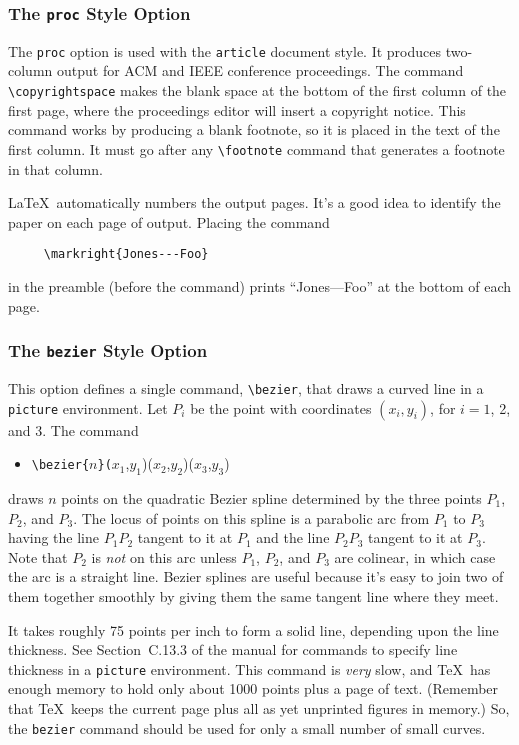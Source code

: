 \subsubsection{The {\tt proc} Style Option}

The {\tt proc} option is used with the \mbox{\tt article} document
style.  It produces two-column output for ACM and IEEE conference
proceedings.  The command \hbox{\verb|\copyrightspace|} makes the blank
space at the bottom of the first column of the first page, where the
proceedings editor will insert a copyright notice.  This command works
by producing a blank footnote, so it is placed in the text of the first
column.  It must go after any \hbox{\verb|\footnote|} command that
generates a footnote in that column.

\LaTeX\ automatically numbers the output pages.  It's a good idea
to identify the paper on each page of output.  Placing the command
\begin{verbatim}
     \markright{Jones---Foo}
\end{verbatim}
in the preamble (before the \hbox{\verb||} command)
prints ``Jones---Foo'' at the bottom of each page.

\subsubsection{The {\tt bezier} Style Option}

This option defines a single command, \hbox{\verb|\bezier|}, that draws
a curved line in a {\tt picture} environment.  Let $P_{i}$ be the point
with coordinates $(x_{i},y_{i})$, for $i=1$, 2, and 3.  The command
\begin{itemize} \tt
\item[]
\verb|\bezier{|$n$\verb|}(|$x_{1}$,$y_{1}$)($x_{2}$,$y_{2}$)($x_{3}$,$y_{3}$)
\end{itemize}
draws $n$ points on the quadratic Bezier spline determined by the three
points $P_{1}$, $P_{2}$, and $P_{3}$.  The locus of points on this
spline is a parabolic arc from $P_{1}$ to $P_{3}$ having the line
$P_{1}P_{2}$ tangent to it at $P_{1}$ and the line $P_{2}P_{3}$ tangent
to it at $P_{3}$.  Note that $P_{2}$ is {\em not\/} on this arc unless
$P_{1}$, $P_{2}$, and $P_{3}$ are colinear, in which case the arc is a
straight line.  Bezier splines are useful because it's easy to join two
of them together smoothly by giving them the same tangent line where
they meet.

It takes roughly 75 points per inch to form a solid line, depending
upon the line thickness.  See Section~C.13.3 of the manual for commands
to specify line thickness in a {\tt picture} environment.  This command
is {\em very\/} slow, and \TeX\ has enough memory to hold only about
1000 points plus a page of text.  (Remember that \TeX\ keeps the
current page plus all as yet unprinted figures in memory.) So, the
\verb|bezier| command should be used for only a small number of small
curves.


